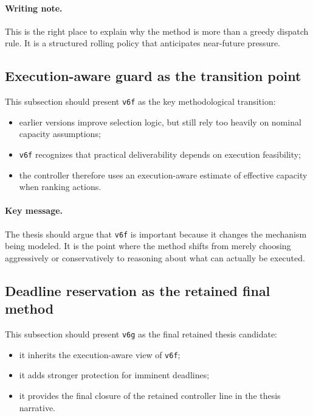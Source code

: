 \paragraph{Writing note.}
This is the right place to explain why the method is more than a greedy dispatch rule. It is a structured rolling policy that anticipates near-future pressure.

\subsection{Execution-aware guard as the transition point}
\label{subsec:arch_execution_guard}

This subsection should present \texttt{v6f} as the key methodological transition:
\begin{itemize}
    \item earlier versions improve selection logic, but still rely too heavily on nominal capacity assumptions;
    \item \texttt{v6f} recognizes that practical deliverability depends on execution feasibility;
    \item the controller therefore uses an execution-aware estimate of effective capacity when ranking actions.
\end{itemize}

\paragraph{Key message.}
The thesis should argue that \texttt{v6f} is important because it changes the mechanism being modeled. It is the point where the method shifts from merely choosing aggressively or conservatively to reasoning about what can actually be executed.

\subsection{Deadline reservation as the retained final method}
\label{subsec:arch_deadline_reservation}

This subsection should present \texttt{v6g} as the final retained thesis candidate:
\begin{itemize}
    \item it inherits the execution-aware view of \texttt{v6f};
    \item it adds stronger protection for imminent deadlines;
    \item it provides the final closure of the retained controller line in the thesis narrative.
\end{itemize}

